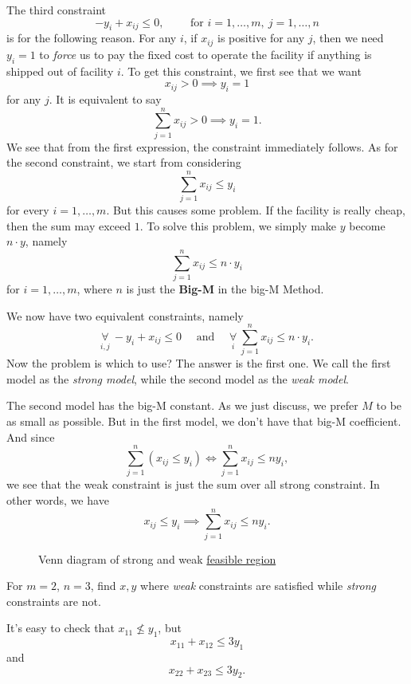 \begin{note}
	The third constraint
	\[
		-y_{i} + x_{ij}\leq 0,\qquad \text{ for }i = 1, \ldots , m,\ j = 1, \ldots , n
	\]
	is for the following reason. For any \(i\), if \(x_{ij}\) is positive for any \(j\), then we need \(y_{i} = 1\) to \emph{force} us to pay the fixed cost to operate the facility if anything is shipped out of facility \(i\). To get this constraint, we first see that we want
	\[
		x_{ij}>0 \implies y_{i} = 1
	\]
	for any \(j\). It is equivalent to say
	\[
		\sum\limits_{j=1}^{n} x_{ij}>0 \implies y_{i} = 1.
	\]
	We see that from the first expression, the constraint immediately follows. As for the second constraint, we start from considering
	\[
		\sum\limits_{j=1}^{n} x_{ij}\leq y_{i}
	\]
	for every \(i = 1, \ldots , m\). But this causes some problem. If the facility is really cheap, then the sum may exceed \(1\). To solve this problem, we simply make \(y\) become \(n\cdot y\), namely
	\[
		\sum\limits_{j=1}^{n} x_{ij}\leq n\cdot y_{i}
	\]
	for \(i = 1, \ldots, m\), where \(n\) is just the \textbf{Big-M} in the big-M Method.
\end{note}

We now have two equivalent constraints, namely
\[
	\underset{i, j}{\forall }\ -y_{i} + x_{ij}\leq 0\quad  \text{ and }\quad \underset{i}{\forall }\ \sum\limits_{j=1}^{n} x_{ij}\leq n\cdot y_{i}.
\]
Now the problem is which to use? The answer is the first one. We call the first model as the \emph{strong model}, while the second model as the \emph{weak model}.

\begin{intuition}
	The second model has the big-M constant. As we just discuss, we prefer \(M\) to be as small as possible. But in the first model, we don't have that big-M coefficient. And since
	\[
		\sum\limits_{j=1}^{n} \left(x_{ij}\leq y_i\right) \iff \sum\limits_{j=1}^{n} x_{ij}\leq n y_{i},
	\]
	we see that the weak constraint is just the sum over all strong constraint. In other words, we have
	\[
		x_{ij}\leq y_i \implies \sum\limits_{j=1}^{n} x_{ij}\leq n y_{i}.
	\]
	\begin{figure}[H]
		\centering
		\caption{Venn diagram of strong and weak \hyperref[def:feasible-region]{feasible region}}
		\label{fig:strong-weak-constraint}
	\end{figure}
\end{intuition}

\begin{eg}
	For \(m = 2\), \(n = 3\), find \(x, y\) where \emph{weak} constraints are satisfied while \emph{strong} constraints are not.
	\begin{center}
	\end{center}
	It's easy to check that \(x_{11}\nleq y_1\), but
	\[
		x_{11}+x_{12} \leq 3y_1
	\]
	and
	\[
		x_{22}+x_{23}\leq 3y_2.
	\]
\end{eg}

